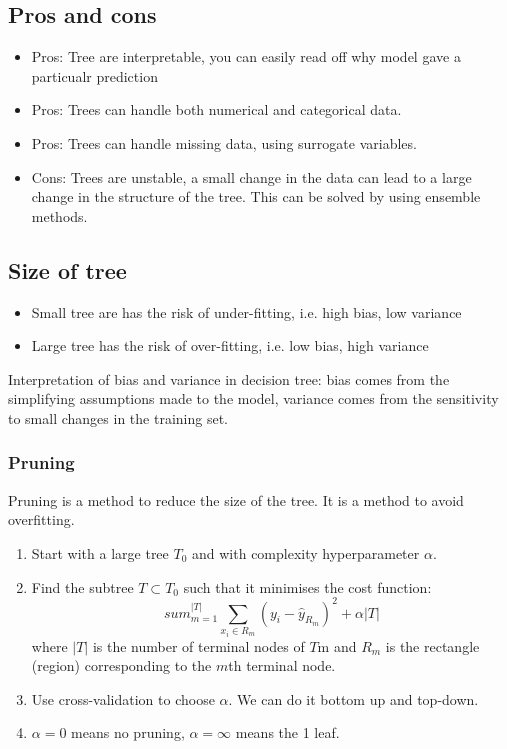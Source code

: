 \documentclass[12pt,a4paper]{article}
\begin{document}
\subsection{Pros and cons}
\begin{itemize}
    \item Pros: Tree are interpretable, you can easily read off why model gave a particualr prediction
    \item Pros: Trees can handle both numerical and categorical data.
    \item Pros: Trees can handle missing data, using surrogate variables.
    \item Cons: Trees are unstable, a small change in the data can lead to a large change in the structure of the tree. This can be solved by using ensemble methods.
\end{itemize}
\subsection{Size of tree}
\begin{itemize}
    \item Small tree are has the risk of under-fitting, i.e. high bias, low variance
    \item Large tree has the risk of over-fitting, i.e. low bias, high variance
\end{itemize}
Interpretation of bias and variance in decision tree: bias comes from the simplifying assumptions made to the model, variance comes from the sensitivity to small changes in the training set.
\subsubsection{Pruning}
Pruning is a method to reduce the size of the tree. It is a method to avoid overfitting.
\begin{enumerate}
    \item Start with a large tree $T_0$ and with complexity hyperparameter $\alpha$.
    \item Find the subtree $T \subset T_0$ such that it minimises the cost function:
    $$
    sum_{m=1}^{|T|} \sum_{x_i \in R_m} \left(y_i - \hat{y}_{R_m}\right)^2 + \alpha |T|
    $$
    where $|T|$ is the number of terminal nodes of $T$m and $R_m$ is the rectangle (region) corresponding to the $m$th terminal node.
    \item Use cross-validation to choose $\alpha$. We can do it bottom up and top-down.
    \item $\alpha =0$ means no pruning, $\alpha = \infty$ means the 1 leaf.
\end{enumerate}
\end{document}
